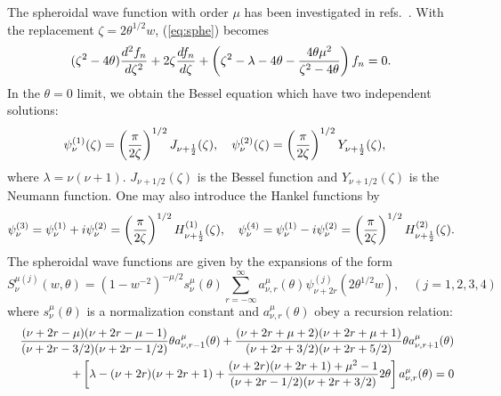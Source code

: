 \documentclass[a4paper,12pt]{article}
\begin{document}
The spheroidal wave function with order $\mu$ has been investigated in 
refs.~\cite{Er,MeSc}. 
With the replacement $\zeta=2\theta^{1/2}w$, (\ref{eq:sphe}) becomes
\begin{equation}
 (\zeta^2-4\theta){d^2 f_{n}\over d\zeta^2}+2\zeta{df_{n}\over d\zeta}
+\left(\zeta^2-\lambda-4\theta-{4\theta\mu^2\over \zeta^2-4\theta}\right)
f_{n}=0.
\label{eq:sphe1}
\end{equation}
In the $\theta=0$ limit, we obtain the Bessel equation which have two 
independent solutions:
\begin{equation}
 \psi^{(1)}_{\nu}(\zeta)=
\left({\pi\over2\zeta}\right)^{1/2}J_{\nu+{1\over2}}(\zeta),\quad
 \psi^{(2)}_{\nu}(\zeta)=
\left({\pi\over2\zeta}\right)^{1/2}Y_{\nu+{1\over2}}(\zeta),\quad
\end{equation}
where $\lambda=\nu(\nu+1)$. $J_{\nu+1/2}(\zeta)$ is the Bessel function
and $Y_{\nu+1/2}(\zeta)$ is the Neumann function.
One may also introduce the Hankel functions by
\begin{equation}
 \psi^{(3)}_{\nu}=\psi^{(1)}_{\nu}+i\psi^{(2)}_{\nu}=
\left({\pi\over2\zeta}\right)^{1/2}H^{(1)}_{\nu+{1\over2}}(\zeta),\quad
 \psi^{(4)}_{\nu}=\psi^{(1)}_{\nu}-i\psi^{(2)}_{\nu}=
\left({\pi\over2\zeta}\right)^{1/2}H^{(2)}_{\nu+{1\over2}}(\zeta).
\end{equation}
The spheroidal wave functions are given by the
expansions
of the form
\begin{equation}
 S^{\mu(j)}_{\nu}(w,\theta)=(1-w^{-2})^{-\mu/2}s^{\mu}_{\nu}(\theta)
\sum_{r=-\infty}^{\infty}a^{\mu}_{\nu,r}(\theta)\psi^{(j)}_{\nu+2r}
(2\theta^{1/2}w),\quad
(j=1,2,3,4)
\end{equation}
where $s^{\mu}_{\nu}(\theta)$ is a normalization constant and 
$a^{\mu}_{\nu,r}(\theta)$ obey a recursion relation:
\begin{eqnarray}
&& {(\nu+2r-\mu)(\nu+2r-\mu-1)\over
(\nu+2r-3/2)(\nu+2r-1/2)}\theta a^{\mu}_{\nu,r-1}(\theta)
+
 {(\nu+2r+\mu+2)(\nu+2r+\mu+1)\over
(\nu+2r+3/2)(\nu+2r+5/2)}\theta a^{\mu}_{\nu,r+1}(\theta)\nonumber\\
&&+\left[
\lambda-(\nu+2r)(\nu+2r+1)+{(\nu+2r)(\nu+2r+1)+\mu^2-1\over
(\nu+2r-1/2)(\nu+2r+3/2)} 2\theta
\right] a^{\mu}_{\nu,r}(\theta)=0
\end{eqnarray}
\end{document}
